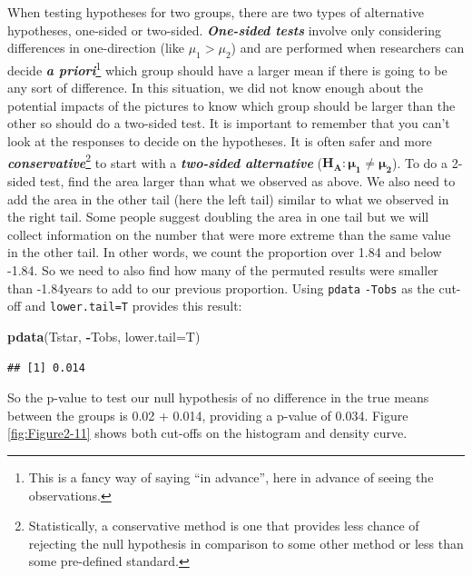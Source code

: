 \documentclass[]{book}
\newenvironment{Shaded}{\begin{snugshade}}{\end{snugshade}}
\newcommand{\KeywordTok}[1]{\textcolor[rgb]{0.13,0.29,0.53}{\textbf{#1}}}
\newcommand{\DataTypeTok}[1]{\textcolor[rgb]{0.13,0.29,0.53}{#1}}
\newcommand{\OperatorTok}[1]{\textcolor[rgb]{0.81,0.36,0.00}{\textbf{#1}}}
\newcommand{\NormalTok}[1]{#1}
\let\rmarkdownfootnote\footnote%
\def\footnote{\protect\rmarkdownfootnote}
\begin{document}
When testing hypotheses for two groups, there are two types of
alternative hypotheses, one-sided or two-sided. \textbf{\emph{One-sided
tests}} involve only considering differences in one-direction (like
\(\mu_1 > \mu_2\)) and are performed when researchers can decide
\textbf{\emph{a priori}}\footnote{This is a fancy way of saying ``in
  advance'', here in advance of seeing the observations.} which group
should have a larger mean if there is going to be any sort of
difference. In this situation, we did not know enough about the
potential impacts of the pictures to know which group should be larger
than the other so should do a two-sided test. It is important to
remember that you can't look at the responses to decide on the
hypotheses. It is often safer and more
\textbf{\emph{conservative}}\footnote{Statistically, a conservative
  method is one that provides less chance of rejecting the null
  hypothesis in comparison to some other method or less than some
  pre-defined standard.} to start with a \textbf{\emph{two-sided
alternative}} (\(\mathbf{H_A: \mu_1 \ne \mu_2}\)). To do a 2-sided test,
find the area larger than what we observed as above. We also need to add
the area in the other tail (here the left tail) similar to what we
observed in the right tail. Some people suggest doubling the area in one
tail but we will collect information on the number that were more
extreme than the same value in the other tail. In other words, we count
the proportion over 1.84 and below -1.84. So we need to also find how
many of the permuted results were smaller than -1.84years to add to our
previous proportion. Using \texttt{pdata} \texttt{-Tobs} as the cut-off
and \texttt{lower.tail=T} provides this result:

\begin{Shaded}
\begin{Highlighting}[]
\KeywordTok{pdata}\NormalTok{(Tstar, }\OperatorTok{-}\NormalTok{Tobs, }\DataTypeTok{lower.tail=}\NormalTok{T)}
\end{Highlighting}
\end{Shaded}

\begin{verbatim}
## [1] 0.014
\end{verbatim}

So the p-value to test our null hypothesis of no difference in the true
means between the groups is 0.02 + 0.014, providing a p-value of 0.034.
Figure \ref{fig:Figure2-11} shows both cut-offs on the histogram and
density curve.
\end{document}
